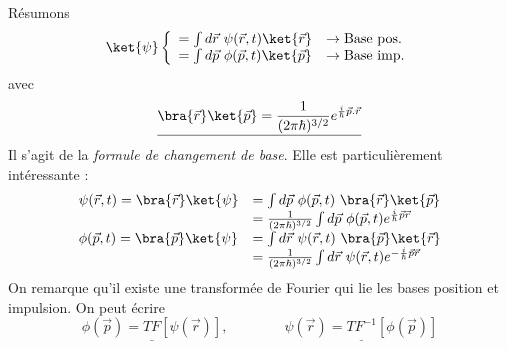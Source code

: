 	Résumons
	\begin{equation}
		\ket{\psi}\left\{\begin{array}{ll}
	= \int d\vec{r}\ \psi(\vec{r},t)\ket{\vec{r}} & \rightarrow\text{Base pos.}\\
	= \int d\vec{p}\ \phi(\vec{p},t)\ket{\vec{p}} & \rightarrow\text{Base imp.}		
	\end{array}\right.
	\end{equation}
	avec
		\begin{equation}
	\underline{\bra{\vec{r}}\ket{\vec{p}} = \frac{1}{(2\pi\hbar)^{3/2}}e^{\frac{i}{\hbar}\vec{p}.\vec{r}}}
	\end{equation}
	Il s'agit de la \textit{formule de changement de base}. Elle est particulièrement intéressante :
	\begin{equation}
	\begin{array}{ll}
		\psi(\vec{r},t) = \bra{\vec{r}}\ket{\psi} &= \int d\vec{p}\ \phi(\vec{p},t)\ \bra{\vec{r}}\ket{\vec{p}}\\
	&= \frac{1}{(2\pi\hbar)^{3/2}}\int d\vec{p}\ \phi(\vec{p},t)e^{\frac{i}{\hbar}\vec{p}\vec{r}}\\
	\phi(\vec{p},t) = \bra{\vec{p}}\ket{\psi} &= \int d\vec{r}\ \psi(\vec{r},t)\ \bra{\vec{p}}\ket{\vec{r}}\\
	&= \frac{1}{(2\pi\hbar)^{3/2}}\int d\vec{r}\ \psi(\vec{r},t)e^{-\frac{i}{\hbar}\vec{p}\vec{r}}		
	\end{array}
		\end{equation}
	On remarque qu'il existe une transformée de Fourier qui lie les bases position et impulsion.
	On peut écrire
	\begin{equation}
	\underline{\phi(\vec p) = TF[\psi(\vec{r})]},\qquad\qquad \underline{\psi(\vec r) = TF^{-1}
	[\phi(\vec{p})]}
	\end{equation}
		
